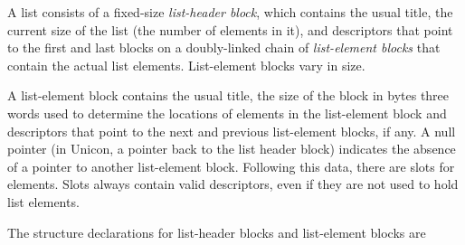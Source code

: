 A list consists of a fixed-size \textit{list-header block}, which
contains the usual title, the current size of the list (the number of
elements in it), and descriptors that point to the first and last
blocks on a doubly-linked chain of \textit{list-element blocks} that
contain the actual list elements. List-element blocks vary in size.


A list-element block contains the usual title, the size of the block
in bytes three words used to determine the locations of elements in
the list-element block and descriptors that point to the next and
previous list-element blocks, if any. A null pointer
\textcolor[rgb]{0.0,0.2784314,1.0}{(in Unicon, a pointer back to the
list header block)} indicates the absence of a pointer to another
list-element block. Following this data, there are slots for
elements. Slots always contain valid descriptors, even if they are not
used to hold list elements.


The structure declarations for list-header blocks and list-element blocks are

